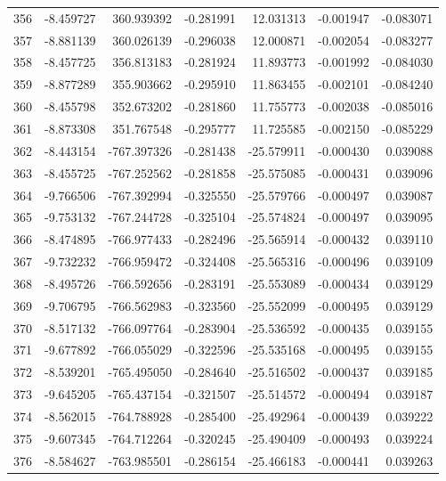 \begin{tabular}{rrrrrrr}
 356 &  -8.459727 &  360.939392 & -0.281991 &   12.031313 &   -0.001947 & -0.083071 \\
 357 &  -8.881139 &  360.026139 & -0.296038 &   12.000871 &   -0.002054 & -0.083277 \\
 358 &  -8.457725 &  356.813183 & -0.281924 &   11.893773 &   -0.001992 & -0.084030 \\
 359 &  -8.877289 &  355.903662 & -0.295910 &   11.863455 &   -0.002101 & -0.084240 \\
 360 &  -8.455798 &  352.673202 & -0.281860 &   11.755773 &   -0.002038 & -0.085016 \\
 361 &  -8.873308 &  351.767548 & -0.295777 &   11.725585 &   -0.002150 & -0.085229 \\
 362 &  -8.443154 & -767.397326 & -0.281438 &  -25.579911 &   -0.000430 &  0.039088 \\
 363 &  -8.455725 & -767.252562 & -0.281858 &  -25.575085 &   -0.000431 &  0.039096 \\
 364 &  -9.766506 & -767.392994 & -0.325550 &  -25.579766 &   -0.000497 &  0.039087 \\
 365 &  -9.753132 & -767.244728 & -0.325104 &  -25.574824 &   -0.000497 &  0.039095 \\
 366 &  -8.474895 & -766.977433 & -0.282496 &  -25.565914 &   -0.000432 &  0.039110 \\
 367 &  -9.732232 & -766.959472 & -0.324408 &  -25.565316 &   -0.000496 &  0.039109 \\
 368 &  -8.495726 & -766.592656 & -0.283191 &  -25.553089 &   -0.000434 &  0.039129 \\
 369 &  -9.706795 & -766.562983 & -0.323560 &  -25.552099 &   -0.000495 &  0.039129 \\
 370 &  -8.517132 & -766.097764 & -0.283904 &  -25.536592 &   -0.000435 &  0.039155 \\
 371 &  -9.677892 & -766.055029 & -0.322596 &  -25.535168 &   -0.000495 &  0.039155 \\
 372 &  -8.539201 & -765.495050 & -0.284640 &  -25.516502 &   -0.000437 &  0.039185 \\
 373 &  -9.645205 & -765.437154 & -0.321507 &  -25.514572 &   -0.000494 &  0.039187 \\
 374 &  -8.562015 & -764.788928 & -0.285400 &  -25.492964 &   -0.000439 &  0.039222 \\
 375 &  -9.607345 & -764.712264 & -0.320245 &  -25.490409 &   -0.000493 &  0.039224 \\
 376 &  -8.584627 & -763.985501 & -0.286154 &  -25.466183 &   -0.000441 &  0.039263 \\

\end{tabular}
